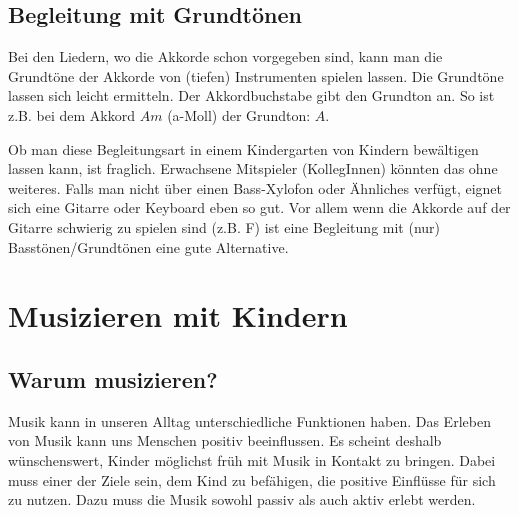 \documentclass[10pt,a4paper,twoside]{report}
\begin{document}
\section{Begleitung mit Grundtönen}
Bei den Liedern, wo die Akkorde schon vorgegeben sind, kann man die Grundtöne der Akkorde von (tiefen) 
Instrumenten spielen lassen. Die Grundtöne lassen sich leicht ermitteln. Der Akkordbuchstabe gibt den 
Grundton an. So ist z.B. bei dem Akkord $Am$ (a-Moll) der Grundton: $A$.

Ob man diese Begleitungsart in einem Kindergarten von Kindern bewältigen lassen kann, ist fraglich. 
Erwachsene Mitspieler (KollegInnen) könnten das ohne weiteres. Falls man nicht über einen Bass-Xylofon 
oder Ähnliches verfügt,
eignet sich eine Gitarre oder Keyboard eben so gut. Vor allem wenn die Akkorde auf der
Gitarre schwierig zu spielen sind 
(z.B. F) ist eine Begleitung mit (nur) Basstönen/Grundtönen eine gute Alternative.

\chapter{Musizieren mit Kindern}
\section{Warum musizieren?}
Musik kann in unseren Alltag unterschiedliche Funktionen haben. Das Erleben von Musik kann uns 
Menschen positiv beeinflussen. Es scheint deshalb wünschenswert, Kinder möglichst früh mit 
Musik in Kontakt zu bringen. Dabei muss einer der Ziele sein, dem Kind zu befähigen, die positive
Einflüsse für sich zu nutzen. Dazu muss die Musik sowohl passiv als auch aktiv
erlebt werden.
\end{document}
